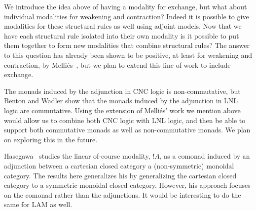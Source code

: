 We introduce the idea above of having a modality for exchange, but
what about individual modalities for weakening and contraction?
Indeed it is possible to give modalities for these structural rules as
well using adjoint models.  Now that we have each structural rule
isolated into their own modality is it possible to put them together
to form new modalities that combine structural rules?  The answer to
this question has already been shown to be positive, at least for
weakening and contraction, by Melli{\'e}s~\cite{Mellies:2004}, but we
plan to extend this line of work to include exchange.

The monads induced by the adjunction in CNC logic is non-commutative,
but Benton and Wadler show that the monads induced by the adjunction
in LNL logic \cite{Benton:1996} are commutative.  Using the extension
of Melli{\'e}s' work we mention above would allow us to combine both
CNC logic with LNL logic, and then be able to support both commutative
monads as well as non-commutative monads.  We plan on exploring this
in the future.

Hasegawa~\cite{EPTCS238.6} studies the linear of-course modality,
$!A$, as a comonad induced by an adjunction between a cartesian closed
category a (non-symmetric) monoidal category.  The results here
generalizes his by generalizing the cartesian closed category to a
symmetric monoidal closed category.  However, his approach focuses on
the comonad rather than the adjunctions.  It would be interesting to
do the same for LAM as well.
